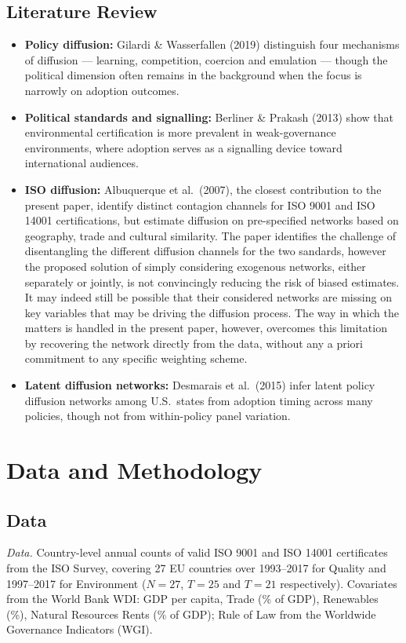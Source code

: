 \documentclass[12pt,a4paper]{article}
\begin{document}
\subsection{Literature Review}

\begin{itemize}

    \item \textbf{Policy diffusion:} Gilardi \& Wasserfallen (2019) distinguish four mechanisms of diffusion --- learning, competition, coercion and emulation --- though the political dimension often remains in the background when the focus is narrowly on adoption outcomes.

    \item \textbf{Political standards and signalling:} Berliner \& Prakash (2013) show that environmental certification is more prevalent in weak-governance environments, where adoption serves as a signalling device toward international audiences.

    \item \textbf{ISO diffusion:} Albuquerque et al.\ (2007), the closest contribution to the present paper, identify distinct contagion channels for ISO 9001 and ISO 14001 certifications, but estimate diffusion on pre-specified networks based on geography, trade and cultural similarity. The paper identifies the challenge of disentangling the different diffusion channels for the two sandards, however the proposed solution of simply considering exogenous networks, either separately or jointly, is not convincingly reducing the risk of biased estimates. It may indeed still be possible that their considered networks are missing on key variables that may be driving the diffusion process. The way in which the matters is handled in the present paper, however, overcomes this limitation by recovering the network directly from the data, without any a priori commitment to any specific weighting scheme.

    \item \textbf{Latent diffusion networks:} Desmarais et al.\ (2015) infer latent policy diffusion networks among U.S.\ states from adoption timing across many policies, though not from within-policy panel variation.

\end{itemize}

\section {Data and Methodology}
\subsection{Data} \textit{Data.} Country-level annual counts of valid ISO 9001 and ISO 14001 certificates from the ISO Survey, covering 27 EU countries over 1993--2017 for Quality and 1997--2017 for Environment ($N=27$, $T=25$ and $T=21$ respectively). Covariates from the World Bank WDI: GDP per capita, Trade (\% of GDP), Renewables (\%), Natural Resources Rents (\% of GDP); Rule of Law from the Worldwide Governance Indicators (WGI).
\end{document}
